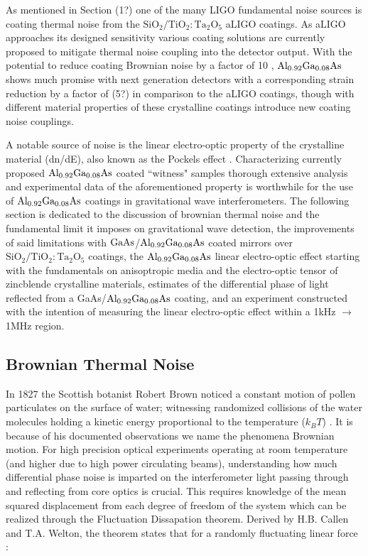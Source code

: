 
 As mentioned in Section (1?) one of the many LIGO fundamental noise sources is coating thermal noise from the $\mathrm{SiO_2}/\mathrm{TiO_2:Ta_2O_5}$ aLIGO coatings. As aLIGO approaches its designed sensitivity various coating solutions are currently proposed to mitigate thermal noise coupling into the detector output.
With the potential to reduce coating Brownian noise by a factor of 10 \cite{Cole:2013}, $\mathrm{Al_{0.92}Ga_{0.08}As}$ shows much promise with next generation detectors with a corresponding strain reduction by a factor of (5?) in comparison to the aLIGO coatings, though with different material properties of these crystalline coatings introduce new coating noise couplings.

A notable source of noise is the linear electro-optic property of the crystalline material (dn/dE), also known as the Pockels effect \cite{abernathy_poster}. Characterizing currently proposed $\mathrm{Al_{0.92}Ga_{0.08}As}$ coated ``witness" samples thorough extensive analysis and experimental data of the aforementioned property is worthwhile for the use of $\mathrm{Al_{0.92}Ga_{0.08}As}$ coatings in gravitational wave interferometers. The following section is dedicated to the discussion of brownian thermal noise and the fundamental limit it imposes on gravitational wave detection, the improvements of said limitations with $\mathrm{GaAs}$/$\mathrm{Al_{0.92}Ga_{0.08}As}$ coated mirrors over $\mathrm{SiO_2}/\mathrm{TiO_2:Ta_2O_5}$ coatings, the $\mathrm{Al_{0.92}Ga_{0.08}As}$ linear electro-optic effect starting with the fundamentals on anisoptropic media and the electro-optic tensor of zincblende crystalline materials, estimates of the differential phase of light reflected from a GaAs/$\mathrm{Al_{0.92}Ga_{0.08}As}$ coating, and an experiment constructed with the intention of measuring the linear electro-optic effect within a 1kHz $\rightarrow$ 1MHz region.

\subsection{Brownian Thermal Noise}
 In 1827 the Scottish botanist Robert Brown noticed a constant motion of pollen particulates on the surface of water; witnessing randomized collisions of the water molecules holding a kinetic energy proportional to the temperature ($k_BT$) \cite{Brown:1828}. It is because of his documented observations we name the phenomena Brownian motion. For high precision optical experiments operating at room temperature (and higher due to high power circulating beams), understanding how much differential phase noise is imparted on the interferometer light passing through and reflecting from core optics is crucial. This requires knowledge of the mean squared displacement from each degree of freedom of the system which can be realized through the Fluctuation Dissapation theorem. Derived by H.B. Callen and T.A. Welton, the theorem states that for a randomly fluctuating linear force \cite{Callen:1951}:

